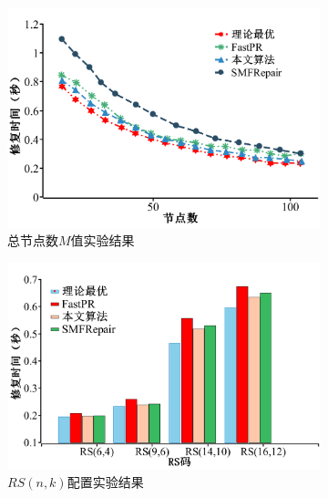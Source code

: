 \begin{figure}[htbp]
	\centering
	\begin{subfigure}[t]{0.4\textwidth}
		\centering
		\includegraphics[width=1.0\linewidth]{figures/3-8.pdf}
		\caption{总节点数$M$值实验结果}
		\label{fig:3-8}
	\end{subfigure}
	\begin{subfigure}[t]{0.4\textwidth}
		\centering
		\includegraphics[width=1.1\linewidth]{figures/3-9.pdf}
		\caption{$RS(n,k)$配置实验结果}
		\label{fig:3-9}
	\end{subfigure}
	\begin{subfigure}[t]{0.4\textwidth}
		\centering

\end{subfigure}
\end{figure}
